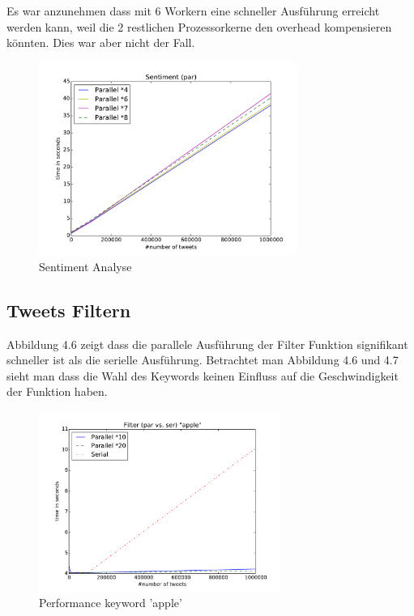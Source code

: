 \documentclass[12pt, oneside]{report}   	%
\begin{document}
Es war anzunehmen dass mit 6 Workern eine schneller Ausführung erreicht werden kann, weil die 2 restlichen Prozessorkerne den overhead kompensieren könnten. Dies war aber nicht der Fall.

\begin{figure}[h]
\begin{center}
\includegraphics[width=0.75\textwidth]{bilder/time_senitment_par.pdf}
\caption{Sentiment Analyse}
\label{img:performancesentiment}
\end{center}
\end{figure}


\subsection{Tweets Filtern}
Abbildung 4.6  zeigt dass die parallele Ausführung der Filter Funktion signifikant schneller ist als die serielle Ausführung. Betrachtet man Abbildung 4.6 und 4.7 sieht man dass die Wahl des Keywords keinen Einfluss auf die Geschwindigkeit der Funktion haben.
\begin{figure}[h]
\begin{center}
\includegraphics[width=0.7\textwidth]{bilder/time_filter_apple.pdf}
\caption{Performance keyword 'apple'}
\label{img:performancefilter1}
\end{center}
\end{figure}
\end{document}
